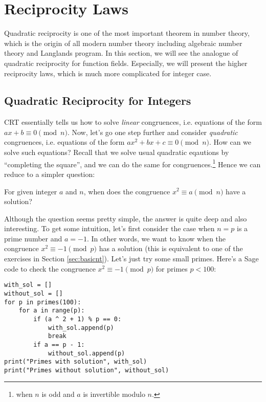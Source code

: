 \section{Reciprocity Laws}
\label{sec:reciprocity}

Quadratic reciprocity is one of the most important theorem in number theory, which is the origin of all modern number theory including algebraic number theory and Langlands program.
In this section, we will see the analogue of quadratic reciprocity for function fields.
Especially, we will present the higher reciprocity laws, which is much more complicated for integer case.

\subsection{Quadratic Reciprocity for Integers}
\label{subsec:quadratic-reciprocity}

CRT essentially tells us how to solve \emph{linear} congruences, i.e. equations of the form $ax + b \equiv 0 \pmod{n}$.
Now, let's go one step further and consider \emph{quadratic} congruences, i.e. equations of the form $a x^2 + bx + c\equiv 0 \pmod{n}$.
How can we solve such equations?
Recall that we solve usual quadratic eqautions by ``completing the square'', and we can do the same for congruences.\footnote{when $n$ is odd and $a$ is invertible modulo $n$.}
Hence we can reduce to a simpler question:

\begin{myquote}
For given integer $a$ and $n$, when does the congruence $x^2 \equiv a \pmod{n}$ have a solution?
\end{myquote}

Although the question seems pretty simple, the answer is quite deep and also interesting.
To get some intuition, let's first consider the case when $n = p$ is a prime number and $a = -1$.
In other words, we want to know when the congruence $x^2 \equiv -1 \pmod{p}$ has a solution (this is equivalent to one of the exercises in Section \ref{sec:basicnt}).
Let's just try some small primes.
Here's a Sage code to check the congruence $x^2 \equiv -1 \pmod{p}$ for primes $p < 100$:

\begin{verbatim}
with_sol = []
without_sol = []
for p in primes(100):
    for a in range(p):
        if (a ^ 2 + 1) % p == 0:
            with_sol.append(p)
            break
        if a == p - 1:
            without_sol.append(p)
print("Primes with solution", with_sol)
print("Primes without solution", without_sol)
\end{verbatim}

